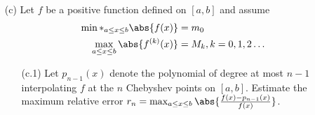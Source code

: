 \documentclass[11pt]{article}
\begin{document}
\begin{enumerate}
\begin{enumerate}
            \item[(c)] %
                Let $f$ be a positive function defined on $[a, b]$ and assume
                \begin{align*}
                    \min*_{a \le x \le b} \abs{f(x)} &= m_0 \\
                    \max_{a \le x \le b} \abs{f^{(k)}(x)} &= M_k, k = 0, 1, 2 \ldots
                \end{align*}
                \begin{enumerate}
                    \item[(c.1)] %
                        Let $p_{n-1}(x)$ denote the polynomial of degree at most
                        $n - 1$ interpolating $f$ at the $n$ Chebyshev points on
                        $[a, b]$.
                        Estimate the maximum relative error
                        $r_n = \max_{a \le x \le b} \abs{\frac{f(x) - p_{n-1}(x)}{f(x)}}$.


\end{enumerate}
\end{enumerate}
\end{enumerate}
\end{document}
